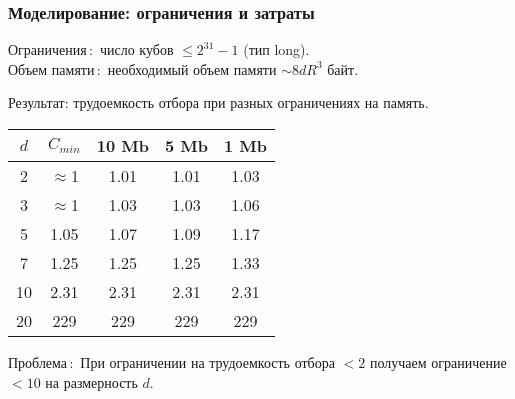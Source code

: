 \documentclass[pdf, intlimits, 9pt, unicode]{beamer} %
\begin{document}
\begin{frame}
    \frametitle{Моделирование: ограничения и затраты}
    \alert{Ограничения\,:}\, число кубов $\leq 2^{31}-1$ (тип long).\\
    \alert{Объем памяти\,:}\, необходимый объем памяти $\sim 8dR^3$
    байт.

    \alert{Результат:} трудоемкость отбора при разных ограничениях
    на память.

    \begin{center}
        \begin{tabular}{|c|c|c|c|c|}
            \hline
            $d$& $C_{min}$ & 10 Mb & 5 Mb &1 Mb\\ \hline
            2& $\approx$1& 1.01 & 1.01 & 1.03\\ \hline
            3& $\approx$1&1.03&1.03&1.06\\ \hline
            5& 1.05 & 1.07 & 1.09& 1.17 \\ \hline
            7&1.25&1.25&1.25&1.33\\\hline
            10& 2.31 & 2.31&2.31 &2.31\\ \hline
            20& 229&229&229&229\\\hline
        \end{tabular}
    \end{center}

    \alert{Проблема\,:}\, При ограничении на трудоемкость отбора
    $<2$ получаем ограничение $<10$ на
    размерность $d$.\\
\end{frame}
\end{document}
